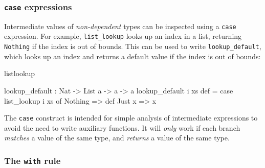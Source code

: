 %
%
%
%
%
%
%
%
%

\subsubsection{\texttt{case} expressions}

Intermediate values of \emph{non-dependent} types can be inspected using a
\texttt{case} expression.  For example, \texttt{list\_lookup} looks up an index
in a list, returning \texttt{Nothing} if the index is out of bounds. This can
be used to write \texttt{lookup\_default}, which looks up an index and
returns a default value if the index is out of bounds:

\begin{SaveVerbatim}{listlookup}

lookup_default : Nat -> List a -> a -> a
lookup_default i xs def = case list_lookup i xs of
                              Nothing => def
                              Just x => x

\end{SaveVerbatim}

The \texttt{case} construct is intended for simple analysis of intermediate
expressions to avoid the need to write auxiliary functions.  It will
\emph{only} work if each branch \emph{matches} a value of the same type, and
\emph{returns} a value of the same type.

\subsubsection{The \texttt{with} rule}

